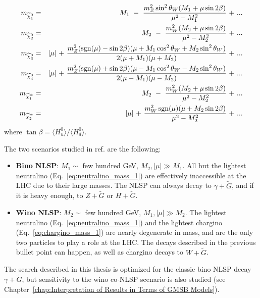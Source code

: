 \documentclass[dissertation.tex]{subfiles}
\begin{document}
\begin{eqnarray}
\label{eq:neutralino_mass_1}
m_{\widetilde{\chi}_{1}^{0}} &=& M_{1}\mbox{ }-\mbox{ }\frac{m_{Z}^{2}\sin^{2}\theta_{W}(M_{1} + \mu\sin 2\beta)}{\mu^{2} - M_{1}^{2}}\mbox{ + }...\\
\label{eq:neutralino_mass_2}
m_{\widetilde{\chi}_{2}^{0}} &=& M_{2}\mbox{ }-\mbox{ }\frac{m_{W}^{2}(M_{2} + \mu\sin 2\beta)}{\mu^{2} - M_{2}^{2}}\mbox{ + }...\\
\label{eq:neutralino_mass_3}
m_{\widetilde{\chi}_{3}^{0}} &=& |\mu|\mbox{ + }\frac{m_{Z}^{2}(\operatorname{sgn}(\mu) - \sin 2\beta)(\mu + M_{1}\cos^{2}\theta_{W} + M_{2}\sin^{2}\theta_{W})}{2(\mu + M_{1})(\mu + M_{2})}\mbox{ + }...\\
\label{eq:neutralino_mass_4}
m_{\widetilde{\chi}_{4}^{0}} &=& |\mu|\mbox{ + }\frac{m_{Z}^{2}(\operatorname{sgn}(\mu) + \sin 2\beta)(\mu - M_{1}\cos^{2}\theta_{W} - M_{2}\sin^{2}\theta_{W})}{2(\mu - M_{1})(\mu - M_{2})}\mbox{ + }...\\
\label{eq:chargino_mass_1}
m_{\widetilde{\chi}_{1}^{\pm}} &=& M_{2}\mbox{ }-\mbox{ }\frac{m_{W}^{2}(M_{2} + \mu\sin 2\beta)}{\mu^{2} - M_{2}^{2}}\mbox{ + }...\\
\label{eq:chargino_mass_2}
m_{\widetilde{\chi}_{2}^{\pm}} &=& |\mu|\mbox{ + }\frac{m_{W}^{2}\operatorname{sgn}(\mu)(\mu + M_{2}\sin 2\beta)}{\mu^{2} - M_{2}^{2}}\mbox{ + }...
\end{eqnarray}
%
where $\tan\beta = \langle H_{u}^{0}\rangle/\langle H_{d}^{0}\rangle$.

The two scenarios studied in ref. \cite{CMS-PAS-SUS-11-009} are the following:

\begin{itemize}
  \item \textbf{Bino NLSP}: $M_{1} \sim$ few hundred GeV, $M_{2}, |\mu| \gg M_{1}$.  All but the lightest neutralino (Eq.~\ref{eq:neutralino_mass_1}) are effectively inaccessible at the LHC due to their large masses.  The NLSP can always decay to $\gamma + \widetilde{G}$, and if it is heavy enough, to $Z + \widetilde{G}$ or $H + \widetilde{G}$.
  \item \textbf{Wino NLSP}: $M_{2} \sim$ few hundred GeV, $M_{1}, |\mu| \gg M_{2}$.  The lightest neutralino (Eq.~\ref{eq:neutralino_mass_1}) and the lightest chargino (Eq.~\ref{eq:chargino_mass_1}) are nearly degenerate in mass, and are the only two particles to play a role at the LHC.  The decays described in the previous bullet point can happen, as well as chargino decays to $W + \widetilde{G}$.
\end{itemize}
%
The search described in this thesis is optimized for the classic bino NLSP decay $\gamma + \widetilde{G}$, but sensitivity to the wino co-NLSP scenario is also studied (see Chapter~\ref{chap:Interpretation of Results in Terms of GMSB Models}).
\end{document}

